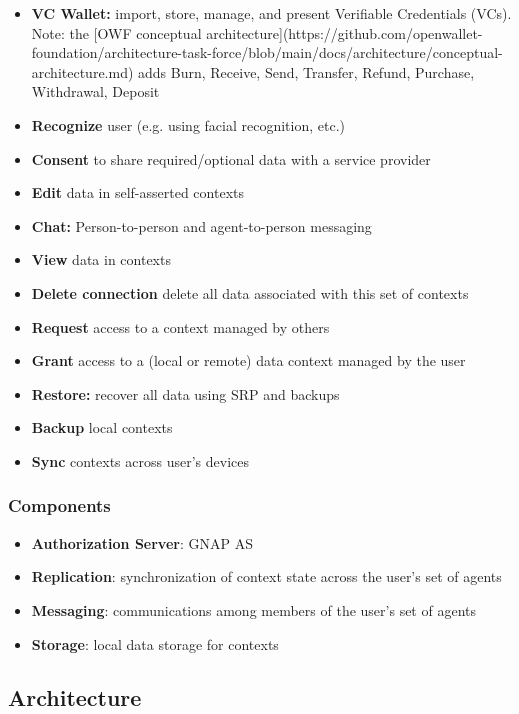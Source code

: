 \documentclass[11pt, oneside]{article}   	%
\begin{document}
\begin{itemize}
\item \textbf{VC Wallet:} import, store, manage, and present Verifiable Credentials (VCs). Note: the [OWF conceptual architecture](https://github.com/openwallet-foundation/architecture-task-force/blob/main/docs/architecture/conceptual-architecture.md) adds Burn, Receive, Send, Transfer, Refund, Purchase, Withdrawal, Deposit
\item \textbf{Recognize} user (e.g. using facial recognition, etc.)
\item \textbf{Consent} to share required/optional data with a service provider
\item \textbf{Edit} data in self-asserted contexts
\item \textbf{Chat:} Person-to-person and agent-to-person messaging
\item \textbf{View} data in contexts
\item \textbf{Delete connection} delete all data associated with this set of contexts
\item \textbf{Request} access to a context managed by others
\item \textbf{Grant} access to a (local or remote) data context managed by the user
\item  \textbf{Restore:} recover all data using SRP and backups
\item \textbf{Backup} local contexts
\item \textbf{Sync} contexts across user's devices
\end{itemize}

\subsubsection{Components}

\begin{itemize}
\item \textbf{Authorization Server}: GNAP AS
\item \textbf{Replication}: synchronization of context state across the user's set of agents
\item \textbf{Messaging}: communications among members of the user's set of agents
\item \textbf{Storage}: local data storage for contexts  
\end{itemize}

\subsection{Architecture}
\end{document}
